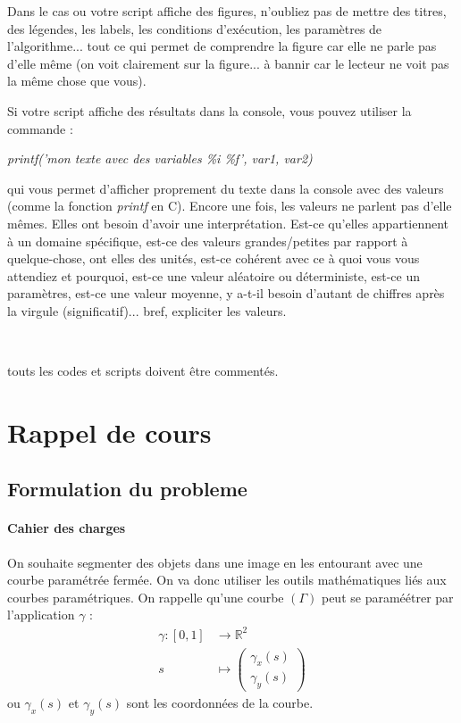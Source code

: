 \documentclass[10pt,a4paper]{article}
\begin{document}
Dans le cas ou votre script affiche des figures,  n'oubliez pas de mettre des titres, des l\'{e}gendes, les labels, les conditions d'ex\'{e}cution, les param\`{e}tres de l'algorithme... tout ce qui permet de comprendre la figure car elle ne parle pas d'elle m\^{e}me (on voit clairement sur la figure... \`{a} bannir car le lecteur ne voit pas la m\^{e}me chose que vous).

Si votre script affiche des r\'{e}sultats dans la console, vous pouvez utiliser la commande :
\begin{center}
 \textit{printf('mon texte avec des variables \%i \%f', var1, var2)}
\end{center}
qui vous permet d'afficher proprement du texte dans la console avec des valeurs (comme la fonction \textit{printf} en C). Encore une fois, les valeurs ne parlent pas d'elle m\^{e}mes. Elles ont besoin d'avoir une interpr\'{e}tation. Est-ce qu'elles appartiennent \`{a} un domaine sp\'{e}cifique, est-ce des valeurs grandes/petites par rapport \`{a} quelque-chose, ont elles des unit\'{e}s, est-ce coh\'{e}rent avec ce \`{a} quoi vous vous attendiez et pourquoi, est-ce une valeur al\'{e}atoire ou d\'{e}terministe, est-ce un param\`{e}tres, est-ce une valeur moyenne, y a-t-il besoin d'autant de chiffres apr\`{e}s la virgule (significatif)... bref, expliciter les valeurs.

~


 touts les codes et scripts doivent \^{e}tre comment\'{e}s.




\section{Rappel de cours}
\subsection{Formulation du probleme}
\paragraph{Cahier des charges} On souhaite segmenter des objets dans une image en les entourant avec une courbe param\'{e}tr\'{e}e ferm\'{e}e. On va donc utiliser les outils math\'{e}matiques li\'{e}s aux courbes param\'{e}triques. On rappelle qu'une courbe $(\Gamma)$ peut se paramé\'{e}trer par l'application $\gamma$ :
\begin{align*}
	\gamma :  [0,1] &\rightarrow \mathbb{R}^2\\
			s &\mapsto \begin{pmatrix}\gamma_x(s)\\ \gamma_y(s)\end{pmatrix}
\end{align*}
ou $\gamma_x(s)$ et $\gamma_y(s)$ sont les coordonn\'{e}es de la courbe. 
\end{document}
